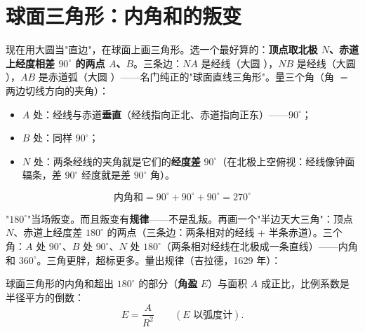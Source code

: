\section{球面三角形：内角和的叛变}

现在用大圆当"直边"，在球面上画三角形。选一个最好算的：\textbf{顶点取北极 $N$、赤道上经度相差 $90^\circ$ 的两点 $A$、$B$}。三条边：$NA$ 是经线（大圆 \checkmark），$NB$ 是经线（大圆 \checkmark），$AB$ 是赤道弧（大圆 \checkmark）——名门纯正的"球面直线三角形"。量三个角（角 $=$ 两边切线方向的夹角）：

\begin{itemize}
\item $A$ 处：经线与赤道\textbf{垂直}（经线指向正北、赤道指向正东）——$90^\circ$；
\item $B$ 处：同样 $90^\circ$；
\item $N$ 处：两条经线的夹角就是它们的\textbf{经度差} $90^\circ$（在北极上空俯视：经线像钟面辐条，差 $90^\circ$ 经度就是差 $90^\circ$ 角）。
\end{itemize}

\[
\boxed{\;\text{内角和} = 90^\circ + 90^\circ + 90^\circ = 270^\circ \;}
\]


"$180^\circ$"当场叛变。而且叛变有\textbf{规律}——不是乱叛。再画一个"半边天大三角"：顶点 $N$、赤道上经度差 $180^\circ$ 的两点（三条边：两条相对的经线 + 半条赤道）。三个角：$A$ 处 $90^\circ$、$B$ 处 $90^\circ$、$N$ 处 $180^\circ$（两条相对经线在北极成一条直线）——内角和 $360^\circ$。三角更胖，超标更多。量出规律（吉拉德，1629 年）：

\begin{dingli}
球面三角形的内角和超出 $180^\circ$ 的部分（\textbf{角盈} $E$）与面积 $A$ 成正比，比例系数是半径平方的倒数：
\[
E = \frac{A}{R^2} \qquad (E \text{ 以弧度计}) .
\]
\end{dingli}

